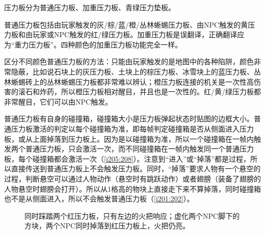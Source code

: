 压力板分为普通压力板、加重压力板、青绿压力垫板。

普通压力板包括由玩家触发的灰/棕/蓝/橙/丛林蜥蜴压力板、由NPC触发的黄压力板和由玩家或NPC触发的红/绿压力板。加重压力板是误翻译，正确翻译应为“重力压力板”。四种颜色的加重压力板功能完全一样。

\begin{remark}
区分不同颜色普通压力板的方法：只能由玩家触发的是地图中的各种陷阱，颜色非常隐蔽，比如说石块上的灰压力板、土块上的棕压力板、冰雪块上的蓝压力板、丛林蜥蜴砖上的丛林蜥蜴压力板都非常难以辨认；橙压力板连接的机关是一次性高伤害的滚石和炸药，所以橙压力板相对醒目，并且也是一次性的。红/黄/绿压力板都非常醒目，它们可以由NPC触发。
\end{remark}

普通压力板有自身的碰撞箱，碰撞箱大小是压力板弹起状态时贴图的边框大小。普通压力板激活的判定以每个碰撞箱为准，即每帧判定碰撞箱是否从侧面进入压力板，或从上面掉落到压力板上。因为是以碰撞箱为准，所以一个碰撞箱在一帧内触发两个普通压力板，只会激活一次，而不同碰撞箱在一帧内触发同一个普通压力板，每个碰撞箱都会激活一次（\autoref{i205:208}）。注意到“进入”或“掉落”都是过程，所以直接传送到普通压力板上不会触发压力板。同时，“掉落”要求人物有一个悬空的过程，判断悬空可以通过人物动作（悬空时有跳跃动作）或者翅膀（装备了翅膀的人物悬空时翅膀会打开）。所以从1格高的物块上直接走下来不算掉落，同时碰撞箱也不是从侧面进入，所以不会触发普通压力板（\autoref{i201:202}）。

\begin{figure}[!ht]
\begin{center}
\qquad
{}
\end{center}
\caption{\protect{}同时踩踏两个红压力板，只有左边的火把响应；\protect{}虚化两个NPC脚下的方块，两个NPC同时掉落到红压力板上，火把仍亮。}
\label{i205:208}
\end{figure}

